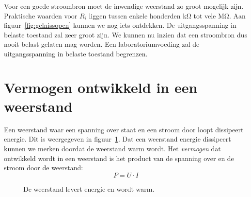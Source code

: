 Voor een goede stroombron moet de inwendige weerstand zo groot mogelijk zijn. Praktische
waarden voor $R_i$ liggen tussen enkele honderden \si{\kilo\ohm} tot vele \si{\mega\ohm}. Aan
figuur~\ref{fig:gelnissopen} kunnen we nog iets ontdekken. De uitgangsspanning in belaste
toestand zal zeer groot zijn. We kunnen nu inzien dat een stroombron dus nooit belast gelaten
mag worden. Een laboratoriumvoeding zal de uitgangsspanning in belaste toestand begrenzen.

\section{Vermogen ontwikkeld in een weerstand}
Een weerstand waar een spanning over staat en een stroom door loopt dissipeert energie. Dit is weergegeven in
figuur~\ref{fig:gelvermogensdissipatie}. Dat een weerstand energie dissipeert kunnen we merken doordat de
weerstand warm wordt.
Het \textsl{vermogen} dat ontwikkeld wordt in een weerstand is het product van de spanning over
en de stroom door de weerstand:
%
\begin{equation}
P = U\cdot I 
\end{equation}

\begin{figure}[!ht]
\centering
{}
\caption{De weerstand levert energie en wordt warm.}
\label{fig:gelvermogensdissipatie}
\end{figure}

